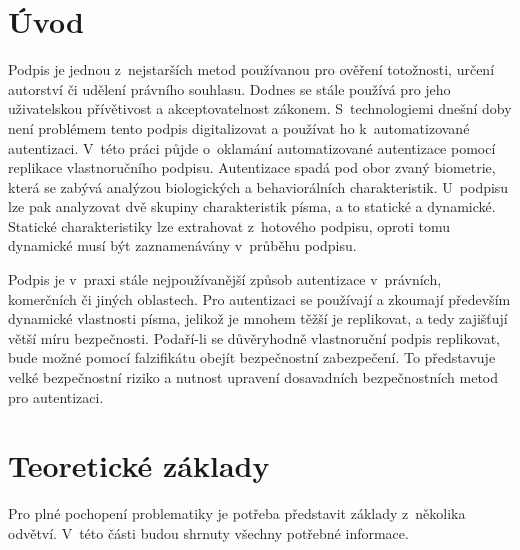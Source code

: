 
%

\chapter{Úvod}
Podpis je jednou z~nejstarších metod používanou pro ověření totožnosti, určení autorství či udělení právního souhlasu.
Dodnes se stále používá pro jeho uživatelskou přívětivost a akceptovatelnost zákonem.
S~technologiemi dnešní doby není problémem tento podpis digitalizovat a používat ho k~automatizované autentizaci.
V~této práci půjde o~oklamání automatizované autentizace pomocí replikace vlastnoručního podpisu.
Autentizace spadá pod obor zvaný biometrie, která se zabývá analýzou biologických a behaviorálních charakteristik. 
U~podpisu lze pak analyzovat dvě skupiny charakteristik písma, a to statické a dynamické. 
Statické charakteristiky lze extrahovat z~hotového podpisu, oproti tomu dynamické musí být zaznamenávány v~průběhu podpisu.

Podpis je v~praxi stále nejpoužívanější způsob autentizace v~právních, komerčních či jiných oblastech. 
Pro autentizaci se používají a zkoumají především dynamické vlastnosti písma, jelikož je mnohem těžší je replikovat, a tedy zajišťují větší míru bezpečnosti.
Podaří-li se důvěryhodně vlastnoruční podpis replikovat, bude možné pomocí falzifikátu obejít bezpečnostní zabezpečení. 
To představuje velké bezpečnostní riziko a nutnost upravení dosavadních bezpečnostních metod pro autentizaci. 

\chapter{Teoretické základy}
Pro plné pochopení problematiky je potřeba představit základy z~několika odvětví. 
V~této části budou shrnuty všechny potřebné informace. 


